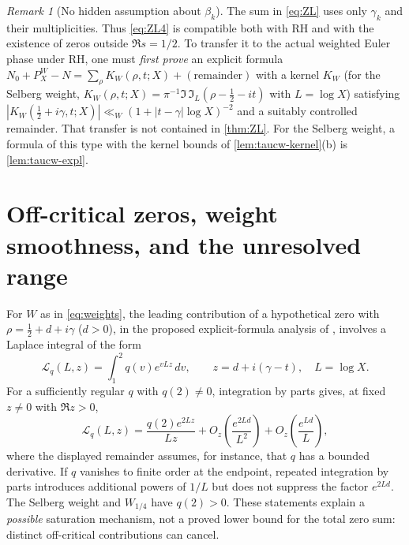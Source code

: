 \documentclass[11pt,a4paper]{article}
\numberwithin{equation}{section}
\theoremstyle{definition}
\theoremstyle{remark}
\newtheorem{remark}[theorem]{Remark}
\begin{document}
\begin{remark}[No hidden assumption about $\beta_k$]\label{rem:ZL}
The sum in \eqref{eq:ZL} uses only $\gamma_k$ and their multiplicities. Thus \eqref{eq:ZL4} is compatible both with RH and with the existence of zeros outside $\Re s=1/2$. To transfer it to the actual weighted Euler phase under RH, one must \emph{first prove} an explicit formula $N_0+P_X^W-N=\sum_\rho K_W(\rho,t;X)+(\text{remainder})$ with a kernel $K_W$ (for the Selberg weight, $K_W(\rho,t;X)=\pi^{-1}\Im\,\mathfrak I_L(\rho-\tfrac12-it)$ with $L=\log X$) satisfying
$|K_W(\frac12+i\gamma,t;X)|\ll_W(1+|t-\gamma|\log X)^{-2}$ and a suitably controlled remainder. That transfer is not contained in \cref{thm:ZL}. For the Selberg weight, a formula of this type with the kernel bounds of \cref{lem:taucw-kernel}(b) is \cref{lem:taucw-expl}.
\end{remark}

\section{Off-critical zeros, weight smoothness, and the unresolved range}\label{sec:open}
For $W$ as in \eqref{eq:weights}, the leading contribution of a hypothetical zero with $\rho=\frac12+d+i\gamma$ ($d>0$), in the proposed explicit-formula analysis of \cite{CasanaDBSRH}, involves a Laplace integral of the form
\begin{equation}\label{eq:laplace}
\mathcal L_q(L,z)=\int_1^2q(v)e^{vLz}\,dv,
\qquad z=d+i(\gamma-t),\quad L=\log X.
\end{equation}
For a sufficiently regular $q$ with $q(2)\ne0$, integration by parts gives, at fixed $z\ne0$ with $\Re z>0$,
\begin{equation}\label{eq:Lap-asympt}
\mathcal L_q(L,z)=\frac{q(2)e^{2Lz}}{Lz}
+O_z\!\left(\frac{e^{2Ld}}{L^2}\right)
+O_z\!\left(\frac{e^{Ld}}L\right),
\end{equation}
where the displayed remainder assumes, for instance, that $q$ has a bounded derivative. If $q$ vanishes to finite order at the endpoint, repeated integration by parts introduces additional powers of $1/L$ but does not suppress the factor $e^{2Ld}$. The Selberg weight and $W_{1/4}$ have $q(2)>0$. These statements explain a \emph{possible} saturation mechanism, not a proved lower bound for the total zero sum: distinct off-critical contributions can cancel.
\end{document}
